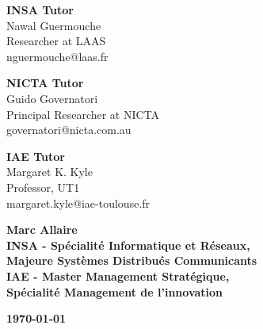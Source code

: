\documentclass[10pt]{report}
\begin{document}
\begin{titlepage}
\begin{center}
\begin{minipage}{.3\textwidth}
\begin{center}
\textbf{INSA Tutor}\\
\small Nawal Guermouche\\
Researcher at LAAS\\
nguermouche@laas.fr
\end{center}
\end{minipage}
\begin{minipage}{.3\textwidth}
\begin{center}
\textbf{NICTA Tutor}\\
\small Guido Governatori\\
Principal Researcher at NICTA\\
governatori@nicta.com.au
\end{center}
\end{minipage}
\begin{minipage}{.3\textwidth}
\begin{center}
\textbf{IAE Tutor}\\
\small Margaret K. Kyle\\
Professor, UT1\\
margaret.kyle@iae-toulouse.fr
\end{center}
\end{minipage}
\end{center}



\vfill
\begin{minipage}{0.55\textwidth}
\begin{flushleft}
\textbf{\large Marc Allaire\\[.5cm] 
\small INSA - Spécialité Informatique et Réseaux,\\\hspace{.5cm}Majeure Systèmes Distribués Communicants\\
IAE - Master Management Stratégique,\\\hspace{.5cm}Spécialité Management de l'innovation}
\end{flushleft}
\end{minipage}
\begin{minipage}{0.4\textwidth}
\begin{flushright}
\textbf{\today}
\end{flushright}
\end{minipage}
\end{titlepage}
\newpage
{} %
\end{document}
